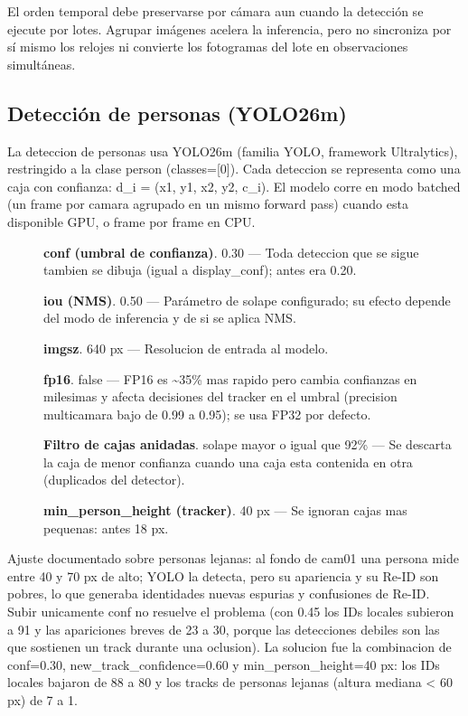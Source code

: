 \documentclass[12pt,letterpaper]{article}
\begin{document}
El orden temporal debe preservarse por cámara aun cuando la detección se ejecute por lotes. Agrupar imágenes acelera la inferencia, pero no sincroniza por sí mismo los relojes ni convierte los fotogramas del lote en observaciones simultáneas.


\subsection{Detección de personas (YOLO26m)}

La deteccion de personas usa YOLO26m (familia YOLO, framework Ultralytics), restringido a la clase person (classes=[0]). Cada deteccion se representa como una caja con confianza: d\_i = (x1, y1, x2, y2, c\_i). El modelo corre en modo batched (un frame por camara agrupado en un mismo forward pass) cuando esta disponible GPU, o frame por frame en CPU.


\begin{description}

\item[] \textbf{conf (umbral de confianza)}. 0.30 — Toda deteccion que se sigue tambien se dibuja (igual a display\_conf); antes era 0.20.

\item[] \textbf{iou (NMS)}. 0.50 — Parámetro de solape configurado; su efecto depende del modo de inferencia y de si se aplica NMS.

\item[] \textbf{imgsz}. 640 px — Resolucion de entrada al modelo.

\item[] \textbf{fp16}. false — FP16 es \textasciitilde{}35\% mas rapido pero cambia confianzas en milesimas y afecta decisiones del tracker en el umbral (precision multicamara bajo de 0.99 a 0.95); se usa FP32 por defecto.

\item[] \textbf{Filtro de cajas anidadas}. solape  mayor o igual que  92\% — Se descarta la caja de menor confianza cuando una caja esta contenida en otra (duplicados del detector).

\item[] \textbf{min\_person\_height (tracker)}. 40 px — Se ignoran cajas mas pequenas: antes 18 px.

\end{description}


Ajuste documentado sobre personas lejanas: al fondo de cam01 una persona mide entre 40 y 70 px de alto; YOLO la detecta, pero su apariencia y su Re-ID son pobres, lo que generaba identidades nuevas espurias y confusiones de Re-ID. Subir unicamente conf no resuelve el problema (con 0.45 los IDs locales subieron a 91 y las apariciones breves de 23 a 30, porque las detecciones debiles son las que sostienen un track durante una oclusion). La solucion fue la combinacion de conf=0.30, new\_track\_confidence=0.60 y min\_person\_height=40 px: los IDs locales bajaron de 88 a 80 y los tracks de personas lejanas (altura mediana < 60 px) de 7 a 1.
\end{document}
